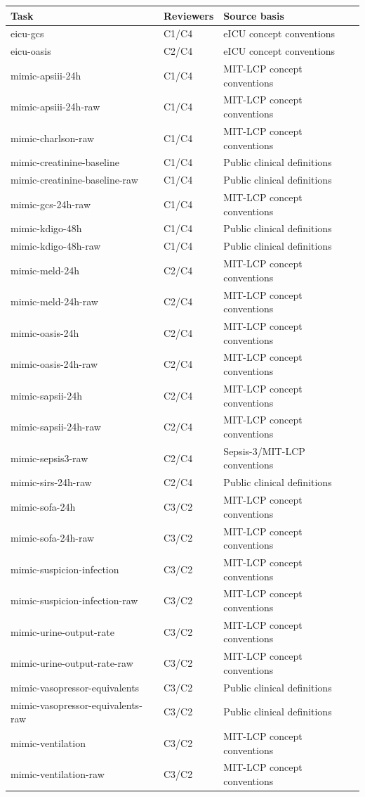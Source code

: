 \begin{tabular}{lll}
\toprule
Task & Reviewers & Source basis \\
\midrule
eicu-gcs & C1/C4 & eICU concept conventions \\
eicu-oasis & C2/C4 & eICU concept conventions \\
mimic-apsiii-24h & C1/C4 & MIT-LCP concept conventions \\
mimic-apsiii-24h-raw & C1/C4 & MIT-LCP concept conventions \\
mimic-charlson-raw & C1/C4 & MIT-LCP concept conventions \\
mimic-creatinine-baseline & C1/C4 & Public clinical definitions \\
mimic-creatinine-baseline-raw & C1/C4 & Public clinical definitions \\
mimic-gcs-24h-raw & C1/C4 & MIT-LCP concept conventions \\
mimic-kdigo-48h & C1/C4 & Public clinical definitions \\
mimic-kdigo-48h-raw & C1/C4 & Public clinical definitions \\
mimic-meld-24h & C2/C4 & MIT-LCP concept conventions \\
mimic-meld-24h-raw & C2/C4 & MIT-LCP concept conventions \\
mimic-oasis-24h & C2/C4 & MIT-LCP concept conventions \\
mimic-oasis-24h-raw & C2/C4 & MIT-LCP concept conventions \\
mimic-sapsii-24h & C2/C4 & MIT-LCP concept conventions \\
mimic-sapsii-24h-raw & C2/C4 & MIT-LCP concept conventions \\
mimic-sepsis3-raw & C2/C4 & Sepsis-3/MIT-LCP conventions \\
mimic-sirs-24h-raw & C2/C4 & Public clinical definitions \\
mimic-sofa-24h & C3/C2 & MIT-LCP concept conventions \\
mimic-sofa-24h-raw & C3/C2 & MIT-LCP concept conventions \\
mimic-suspicion-infection & C3/C2 & MIT-LCP concept conventions \\
mimic-suspicion-infection-raw & C3/C2 & MIT-LCP concept conventions \\
mimic-urine-output-rate & C3/C2 & MIT-LCP concept conventions \\
mimic-urine-output-rate-raw & C3/C2 & MIT-LCP concept conventions \\
mimic-vasopressor-equivalents & C3/C2 & Public clinical definitions \\
mimic-vasopressor-equivalents-raw & C3/C2 & Public clinical definitions \\
mimic-ventilation & C3/C2 & MIT-LCP concept conventions \\
mimic-ventilation-raw & C3/C2 & MIT-LCP concept conventions \\
\bottomrule
\end{tabular}
